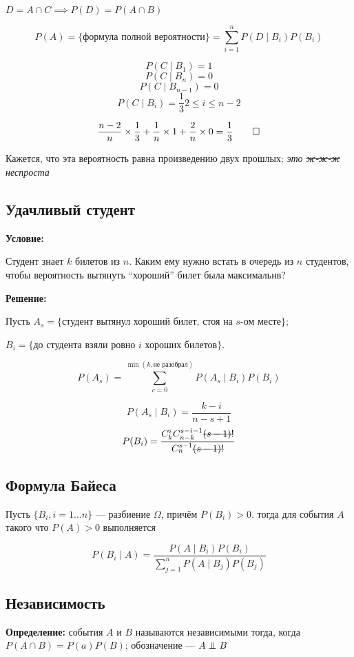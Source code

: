     $D = A\cap C \implies P(D) = P(A\cap B)$ 

    \[P(A) = \{\text{формула полной вероятности}\} = \sum\limits_{i=1}^n P(D\mid B_i)P(B_i)\]


    \[P(C\mid B_1) = 1\]
    \[P(C\mid B_n) = 0\]
    \[P(C\mid B_{n-1}) = 0\]
    \[P(C\mid B_i) = \frac{1}{3} 2\leqslant i\leqslant n-2\]

    \[\frac{n-2}{n}\times\frac{1}{3} + \frac{1}{n}\times 1 + \frac{2}{n}\times 0 = \frac{1}{3} \qed\]

    Кажется, что эта вероятность равна произведению двух прошлых; \emph{это \sout{ж-ж-ж} неспроста}

\subsection{Удачливый студент}

\textbf{Условие:}

Студент знает $k$ билетов из $n$. Каким ему нужно встать в очередь из $n$ студентов, чтобы вероятность вытянуть ``хороший'' билет была максимальнв?

\textbf{Решение:} 

Пусть $A_s = \{\text{студент вытянул хороший билет, стоя на $s$-ом месте}\}$;

$B_i = \{\text{до студента взяли ровно $i$ хороших билетов}\}$.

\[P(A_s) = \sum\limits_{c = 0}^{\min(k, \text{не разобрал})} P(A_s\mid B_i)P(B_i)\]

\[P(A_s\mid B_i) = \frac{k-i}{n-s+1}\]
\[P(B_i) = \frac{C_k^i C_{n-k}^{s-i-1}\text{\sout{$(s-1)!$}}}{C_n^{s-1}\text{\sout{$(s-1)!$}}}\]



\subsection{Формула Байеса}

Пусть $\{B_i, i = 1\ldots n\}$ --- разбиение $\Omega$, причём $P(B_i) > 0$. тогда для события $A$ такого что $P(A) > 0$ выполняется

\[P(B_i\mid A) = \frac{P(A\mid B_i)P(B_i)}{\sum\limits_{j=1}^nP(A\mid B_j)P(B_j)}\]

\subsection{Независимость}

\textbf{Определение:} события $A$ и $B$ называются независимыми тогда, когда $P(A\cap B) = P(a)P(B)$; обозначение  --- $A \independent B$

